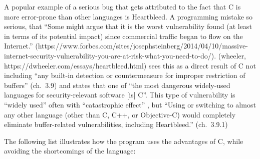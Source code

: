 A popular example of a serious bug that gets attributed to the fact that
C is more error-prone than other languages is Heartbleed. A programming
mistake so serious, that ``Some might argue that it is the worst
vulnerability found (at least in terms of its potential impact) since
commercial traffic began to flow on the Internet.''
(https://www.forbes.com/sites/josephsteinberg/2014/04/10/massive-internet-security-vulnerability-you-are-at-risk-what-you-need-to-do/).
(wheeler, https://dwheeler.com/essays/heartbleed.html) sees this as a
direct result of C not including ``any built-in detection or
countermeasure for improper restriction of buffers'' (ch.~3.9) and
states that one of ``the most dangerous widely-used languages for
security-relevant software {[}is{]} C''. This type of vulnerability is
``widely used'' often with ``catastrophic effect'' , but ``Using or
switching to almost any other language (other than C, C++, or
Objective-C) would completely eliminate buffer-related vulnerabilities,
including Heartbleed.'' (ch.~3.9.1)

The following list illustrates how the program uses the advantages of C,
while avoiding the shortcomings of the language:

